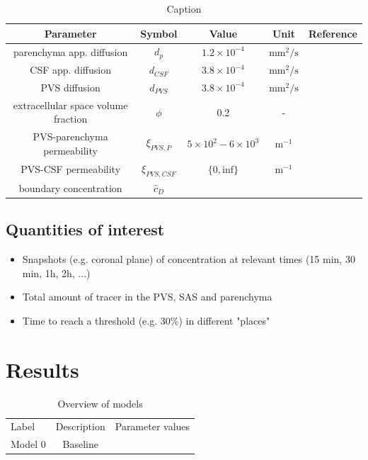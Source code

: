 \documentclass[fleqn,10pt]{wlscirep}
\begin{document}
\begin{table}
    \centering
    \begin{tabular}{|c|c|c|c|c|} \hline 
 Parameter& Symbol& Value& Unit&Reference\\ \hline 
         parenchyma app. diffusion&  $d_p$&  $1.2 \times 10^{-4}$& $\text{mm}^2/\text{s}$  & \cite{valnes2020apparent}\\\hline 
         CSF app. diffusion&  $d_{CSF}$&  $3.8 \times 10^{-4}$& $\text{mm}^2/\text{s}$ & \cite{valnes2020apparent}\\\hline 
         PVS diffusion&  $d_{PVS}$&  $3.8 \times 10^{-4}$& $\text{mm}^2/\text{s}$ & \cite{valnes2020apparent}\\\hline 
         extracellular space volume fraction& $\phi$& 0.2& - &\cite{nicholson1981ion} \\\hline 
         PVS-parenchyma permeability&  $\xi_{PVS,P}$& $5 \times 10^{2} - 6 \times 10^{3} $  & $\text{m}^{-1}$ & \cite{koch2023estimates} \\\hline 
         PVS-CSF permeability&  $\xi_{PVS,CSF}$& $\{0, \text{inf}\}$ & $\text{m}^{-1}$ & \\ \hline 
 boundary concentration& $\hat{c}_D$& & &\\ \hline
    \end{tabular}
    \caption{Caption}
    \label{tab:parameters}
\end{table}

\subsection*{Quantities of interest}

\begin{itemize}
    \item Snapshots (e.g. coronal plane) of concentration at relevant times (15 min, 30 min, 1h, 2h, ...) 
    \item Total amount of tracer in the PVS, SAS and parenchyma
     \item Time to reach a threshold (e.g. 30\%) in different "places"
\end{itemize}

\section*{Results}

\begin{table}
\begin{center}
    \begin{tabular}{l|cc}
    \toprule
    Label & Description & Parameter values \\
    Model 0 & Baseline &  \\
    \bottomrule
    \end{tabular}
    \end{center}
    \caption{Overview of models}
\end{table}
\end{document}
